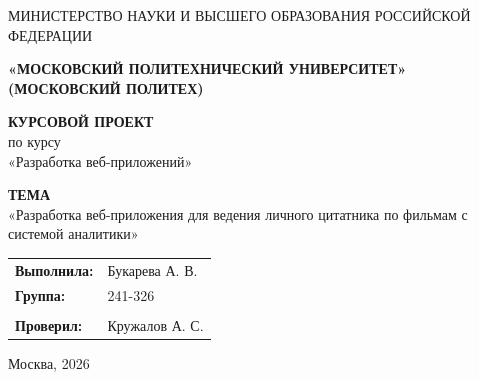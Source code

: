 \thispagestyle{empty}

\begin{center}
    {\small МИНИСТЕРСТВО НАУКИ И ВЫСШЕГО ОБРАЗОВАНИЯ РОССИЙСКОЙ ФЕДЕРАЦИИ}
    
    
    {\small \textbf{«МОСКОВСКИЙ ПОЛИТЕХНИЧЕСКИЙ УНИВЕРСИТЕТ»}} \\
    {\small \textbf{(МОСКОВСКИЙ ПОЛИТЕХ)}}

    \vspace{4cm}

    {\Large \textbf{КУРСОВОЙ ПРОЕКТ}} \\[1cm]
    {\large по курсу \\ «Разработка веб-приложений»}

    \vspace{1.5cm}

    \textbf{ТЕМА} \\[0.3cm]
    {\large «Разработка веб-приложения для ведения личного цитатника 
    по фильмам с системой аналитики»}

    \vspace{3cm}

    \hfill
    \begin{tabular}{p{3cm} l}
        \textbf{Выполнила:} & Букарева А. В. \\
        \textbf{Группа:}   & 241-326 \\
        \\
        \textbf{Проверил:}  & Кружалов А. С.
    \end{tabular}

    \vfill

    Москва, 2026

\end{center}
\newpage
